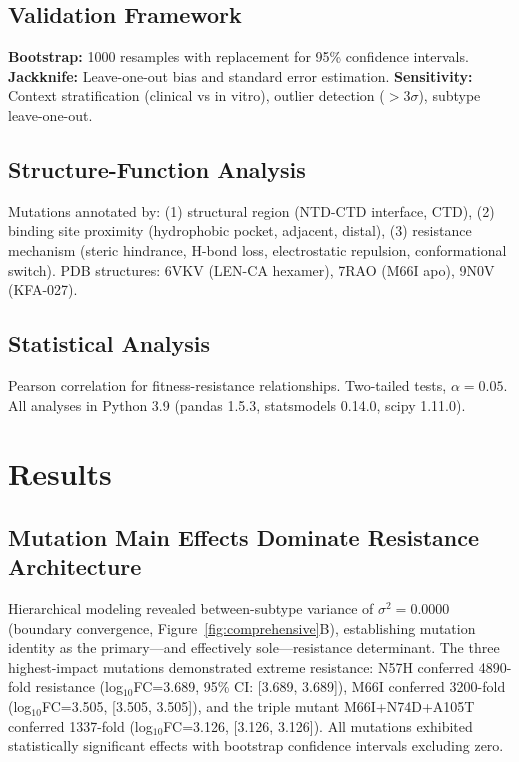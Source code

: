 \documentclass[twocolumn]{article}
\begin{document}
\subsection{Validation Framework}
\textbf{Bootstrap:} 1000 resamples with replacement for 95\% confidence intervals. \textbf{Jackknife:} Leave-one-out bias and standard error estimation. \textbf{Sensitivity:} Context stratification (clinical vs in vitro), outlier detection ($>3\sigma$), subtype leave-one-out.

\subsection{Structure-Function Analysis}
Mutations annotated by: (1) structural region (NTD-CTD interface, CTD), (2) binding site proximity (hydrophobic pocket, adjacent, distal), (3) resistance mechanism (steric hindrance, H-bond loss, electrostatic repulsion, conformational switch). PDB structures: 6VKV (LEN-CA hexamer), 7RAO (M66I apo), 9N0V (KFA-027).

\subsection{Statistical Analysis}
Pearson correlation for fitness-resistance relationships. Two-tailed tests, $\alpha=0.05$. All analyses in Python 3.9 (pandas 1.5.3, statsmodels 0.14.0, scipy 1.11.0).

\section{Results}

\subsection{Mutation Main Effects Dominate Resistance Architecture}

Hierarchical modeling revealed between-subtype variance of $\sigma^2=0.0000$ (boundary convergence, Figure~\ref{fig:comprehensive}B), establishing mutation identity as the primary—and effectively sole—resistance determinant. The three highest-impact mutations demonstrated extreme resistance: N57H conferred 4890-fold resistance (log$_{10}$FC=3.689, 95\% CI: [3.689, 3.689]), M66I conferred 3200-fold (log$_{10}$FC=3.505, [3.505, 3.505]), and the triple mutant M66I+N74D+A105T conferred 1337-fold (log$_{10}$FC=3.126, [3.126, 3.126]). All mutations exhibited statistically significant effects with bootstrap confidence intervals excluding zero.
\end{document}
